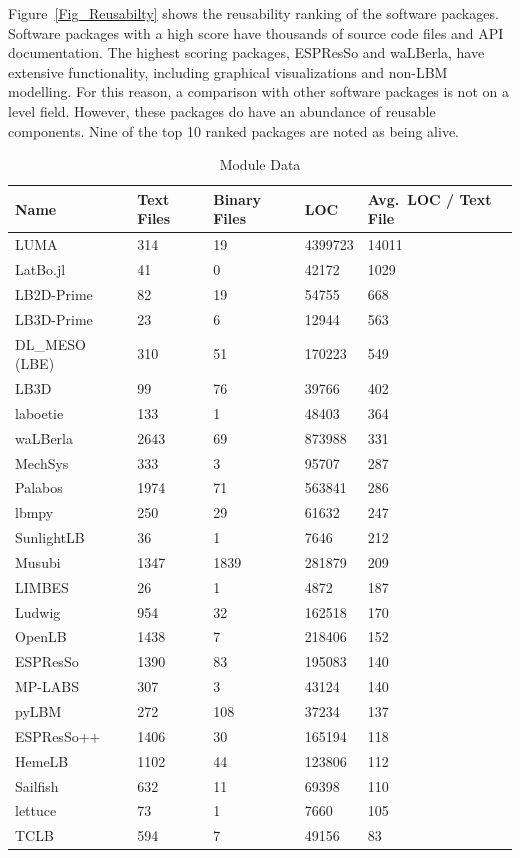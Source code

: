 \documentclass[final, 3p, times, authoryear]{elsarticle}
\begin{document}
Figure~\ref{Fig_Reusabilty} shows the reusability ranking of the software
packages. Software packages with a high score have thousands of source code
files and API documentation. The highest scoring packages, ESPResSo and
waLBerla, have extensive functionality, including graphical visualizations and
non-LBM modelling. For this reason, a comparison with other software packages is
not on a level field. However, these packages do have an abundance of reusable
components. Nine of the top 10 ranked packages are noted as being alive.

\begin{table}
	\begin{center}
		\begin{tabular}{ p{3.5cm}p{2cm}p{2.5cm}p{2cm}p{2.5cm} }
			\toprule
			Name & Text Files & Binary Files & LOC & Avg.\ LOC / Text File\\
			\midrule
			LUMA & 314 & 19 & 4399723 & 14011\\
			LatBo.jl & 41& 0 & 42172 & 1029\\
			LB2D-Prime & 82& 19 & 54755 & 668\\
			LB3D-Prime & 23& 6 & 12944 & 563\\
			DL\_MESO (LBE) & 310 & 51 & 170223 & 549\\
			LB3D & 99 & 76 & 39766 & 402\\
			laboetie & 133& 1 & 48403 & 364\\
			waLBerla & 2643 & 69 & 873988 & 331\\
			MechSys & 333 & 3 & 95707 & 287\\
			Palabos & 1974 & 71 & 563841 & 286\\
			lbmpy& 250 & 29 & 61632 & 247\\
			SunlightLB & 36 & 1 & 7646 & 212\\
			Musubi & 1347 & 1839 & 281879 & 209\\
			LIMBES & 26 & 1 & 4872 & 187\\
			Ludwig & 954 & 32 & 162518 & 170\\
			OpenLB & 1438 & 7 & 218406 & 152\\
			ESPResSo & 1390& 83 & 195083 & 140\\
			MP-LABS & 307 & 3 & 43124 & 140\\
			pyLBM & 272 & 108 & 37234 & 137\\
			ESPResSo++ & 1406& 30 & 165194 & 118\\
			HemeLB & 1102& 44 & 123806 & 112\\
			Sailfish & 632 & 11 & 69398 & 110\\
			lettuce & 73 & 1 & 7660 & 105\\
			TCLB & 594 & 7 & 49156 & 83\\
			\bottomrule
		\end{tabular}
		\caption{Module Data} \label{moduledata}
	\end{center}
\end{table}
\end{document}
